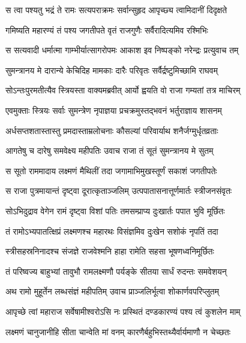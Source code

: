 \twolineshloka
{स त्वा पश्यतु भद्रं ते रामः सत्यपराक्रमः}
{सर्वान्सुहृद आपृच्छ्य त्वामिदानीं दिदृक्षते} %

\twolineshloka
{गमिष्यति महारण्यं तं पश्य जगतीपते}
{वृतं राजगुणैः सर्वैरादित्यमिव रश्मिभिः} %

\twolineshloka
{स सत्यवादी धर्मात्मा गाम्भीर्यात्सागरोपमः}
{आकाश इव निष्पङ्को नरेन्द्रः प्रत्युवाच तम्} %

\twolineshloka
{सुमन्त्रानय मे दारान्ये केचिदिह मामकाः}
{दारैः परिवृतः सर्वैर्द्रष्टुमिच्छामि राघवम्} %

\twolineshloka
{सोऽन्तःपुरमतीत्यैव स्त्रियस्ता वाक्यमब्रवीत्}
{आर्यो ह्वयति वो राजा गम्यतां तत्र माचिरम्} %

\twolineshloka
{एवमुक्ताः स्त्रियः सर्वाः सुमन्त्रेण नृपाज्ञया}
{प्रचक्रमुस्तद्भवनं भर्तुराज्ञाय शासनम्} %

\twolineshloka
{अर्धसप्तशतास्तास्तु प्रमदास्ताम्रलोचनाः}
{कौसल्यां परिवार्याथ शनैर्जग्मुर्धृतव्रताः} %

\twolineshloka
{आगतेषु च दारेषु समवेक्ष्य महीपतिः}
{उवाच राजा तं सूतं सुमन्त्रानय मे सुतम्} %

\twolineshloka
{स सूतो राममादाय लक्ष्मणं मैथिलीं तदा}
{जगामाभिमुखस्तूर्णं सकाशं जगतीपतेः} %

\twolineshloka
{स राजा पुत्रमायान्तं दृष्ट्वा दूरात्कृताञ्जलिम्}
{उत्पपातासनात्तूर्णमार्तः स्त्रीजनसंवृतः} %

\twolineshloka
{सोऽभिदुद्राव वेगेन रामं दृष्ट्वा विशां पतिः}
{तमसम्प्राप्य दुःखार्तः पपात भुवि मूर्छितः} %

\twolineshloka
{तं रामोऽभ्यपातत्क्षिप्रं लक्ष्मणश्च महारथः}
{विसंज्ञमिव दुःखेन सशोकं नृपतिं तदा} %

\twolineshloka
{स्त्रीसहस्रनिनादश्च संजज्ञे राजवेश्मनि}
{हाहा रामेति सहसा भूषणध्वनिमूर्छितः} %

\twolineshloka
{तं परिष्वज्य बाहुभ्यां तावुभौ रामलक्ष्मणौ}
{पर्यङ्के सीतया सार्धं रुदन्तः समवेशयन्} %

\twolineshloka
{अथ रामो मुहूर्तेन लब्धसंज्ञं महीपतिम्}
{उवाच प्राञ्जलिर्भूत्वा शोकार्णवपरिप्लुतम्} %

\twolineshloka
{आपृच्छे त्वां महाराज सर्वेषामीश्वरोऽसि नः}
{प्रस्थितं दण्डकारण्यं पश्य त्वं कुशलेन माम्} %

\twolineshloka
{लक्ष्मणं चानुजानीहि सीता चान्वेति मां वनम्}
{कारणैर्बहुभिस्तथ्यैर्वार्यमाणौ न चेच्छतः} %

